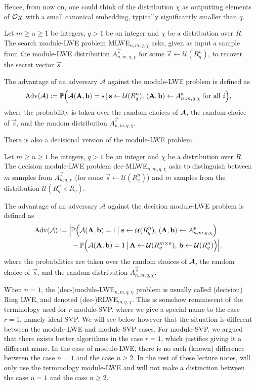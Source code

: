 Hence, from now on, one could think of the distribution $\chi$ as outputting elements of $\mathcal{O}_K$ with a small canonical embedding, typically significantly smaller than $q$.

\begin{definition}
Let $m \geq n \geq 1$ be integers, $q >1$ be an integer and $\chi$ be a distribution over $R$. The search module-LWE problem MLWE$_{n,m,q,\chi}$ asks, given as input a sample from the module-LWE distribution $A^{\vec s}_{n,m,q,\chi}$ for some $\vec s \leftarrow \mathcal{U}(R_q^n)$, to recover the secret vector $\vec s$.

The advantage of an adversary $\mathcal{A}$ against the module-LWE problem is defined as
\[ \operatorname{Adv}(\mathcal{A}) := \mathbb{P}\Big(\mathcal{A}(\mathbf A, \mathbf b) = \mathbf s\,|\, \mathbf s \leftarrow \mathcal{U}(R_q^n),\, (\mathbf A, \mathbf b) \leftarrow A^{\mathbf s}_{n,m,q,\chi} \text{ for all }i\Big), \]
where the probability is taken over the random choices of $\mathcal{A}$, the random choice of $\vec s$, and the random distribution $A^{\vec s}_{n,m,q,\chi}$.
\end{definition}

There is also a decisional version of the module-LWE problem.

\begin{definition}
Let $m \geq n \geq 1$ be integers, $q >1$ be an integer and $\chi$ be a distribution over $R$. The decision module-LWE problem dec-MLWE$_{n,m,q,\chi}$ asks to distinguish between $m$ samples from $A^{\vec s}_{n,q,\chi}$ (for some $\vec s \leftarrow \mathcal{U}(R_q^n)$) and $m$ samples from the distribution $\mathcal{U}(R_q^n \times R_q)$.

The advantage of an adversary $\mathcal{A}$ against the decision module-LWE problem is defined as
\begin{align*} \operatorname{Adv}(\mathcal{A}) := \Big| &\mathbb{P}\Big(\mathcal{A}(\mathbf A, \mathbf b) = 1\,\big|\, \mathbf s \leftarrow \mathcal{U}(R_q^n),\, (\mathbf A, \mathbf b) \leftarrow A^{\mathbf s}_{n,m,q,\chi}\Big) \\
&- \mathbb{P}\Big(\mathcal{A}(\mathbf A, \mathbf b) = 1\,\big|\, \mathbf A \leftarrow \mathcal{U}(R_q^{m \times n}), \, \mathbf b \leftarrow \mathcal{U}(R_q^n)\Big) \Big|,
\end{align*}
where the probabilities are taken over the random choices of $\mathcal{A}$, the random choice of $\vec s$, and the random distribution $A^{\vec s}_{n,m,q,\chi}$.
\end{definition}

When $n = 1$, the (dec-)module-LWE$_{n,m,q,\chi}$ problem is usually called (decision) Ring LWE, and denoted (dec-)RLWE$_{m,q,\chi}$.
This is somehow reminiscent of the terminology used for $r$-module-SVP, where we give a special name to the case $r = 1$, namely ideal-SVP.
We will see below however that the situation is different between the module-LWE and module-SVP cases. For module-SVP, we argued that there exists better algorithms in the case $r = 1$, which justifies giving it a different name. In the case of module-LWE, there is no such (known) difference between the case $n = 1$ and the case $n \geq 2$. In the rest of these lecture notes, will only use the terminology module-LWE and will not make a distinction between the case $n = 1$ and the case $n \geq 2$.

